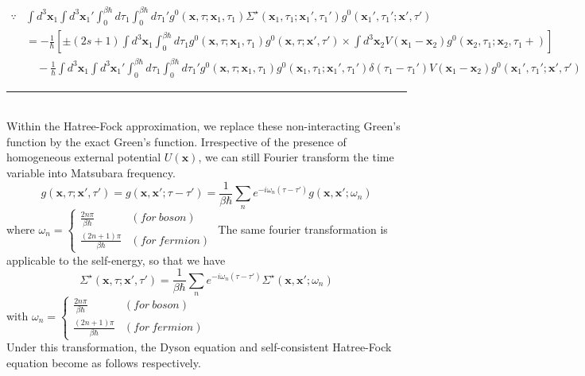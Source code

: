 \[
\begin{aligned}
\because &\int d^3 \mathbf{x}_1 \int d^3 \mathbf{x}_1' \int_0^{\beta\hbar} d\tau_1 \int_0^{\beta\hbar} d\tau_1' g^0(\mathbf{x},\tau;\mathbf{x}_1,\tau_1) \Sigma^\star(\mathbf{x}_1,\tau_1;\mathbf{x}_1',\tau_1') g^0(\mathbf{x}_1',\tau_1';\mathbf{x}',\tau')\\
&=-\frac{1}{\hbar} \left[\pm(2s+1)\int d^3 \mathbf{x}_1 \int_0^{\beta\hbar} d\tau_1 g^0(\mathbf{x},\tau;\mathbf{x}_1,\tau_1) g^0(\mathbf{x},\tau;\mathbf{x}',\tau')\times\int d^3 \mathbf{x}_2 V(\mathbf{x}_1-\mathbf{x}_2) g^0(\mathbf{x}_2,\tau_1;\mathbf{x}_2,\tau_1+)\right]\\
&\quad-\frac{1}{\hbar} \int d^3 \mathbf{x}_1 \int d^3 \mathbf{x}_1' \int_0^{\beta\hbar} d\tau_1 \int_0^{\beta\hbar} d\tau_1' g^0(\mathbf{x},\tau;\mathbf{x}_1,\tau_1) g^0(\mathbf{x}_1,\tau_1;\mathbf{x}_1',\tau_1') \delta(\tau_1-\tau_1') V(\mathbf{x}_1-\mathbf{x}_2) g^0(\mathbf{x}_1',\tau_1';\mathbf{x}',\tau')
\end{aligned}
\]
\rule{\textwidth}{1mm}\\
Within the Hatree-Fock approximation, we replace these non-interacting Green's function by the exact Green's function.
Irrespective of the presence of homogeneous external potential $U(\mathbf{x})$, we can still Fourier transform the time variable into Matsubara frequency.
\begin{equation}
g(\mathbf{x},\tau;\mathbf{x}',\tau')=g(\mathbf{x},\mathbf{x}';\tau-\tau')=\frac{1}{\beta\hbar}\sum_n e^{-i\omega_n(\tau-\tau')} g(\mathbf{x},\mathbf{x}';\omega_n)
\end{equation}
where
$
\omega_n=
\begin{cases}
\frac{2n\pi}{\beta\hbar} & (for\ boson)\\
\frac{(2n+1)\pi}{\beta\hbar} & (for\ fermion)
\end{cases}
$
The same fourier transformation is applicable to the self-energy, so that we have
\begin{equation}
\Sigma^\star(\mathbf{x},\tau;\mathbf{x}',\tau')=\frac{1}{\beta\hbar}\sum_n e^{-i\omega_n(\tau-\tau')} \Sigma^\star(\mathbf{x},\mathbf{x}';\omega_n)
\end{equation}
with $
\omega_n=
\begin{cases}
\frac{2n\pi}{\beta\hbar} & (for\ boson)\\
\frac{(2n+1)\pi}{\beta\hbar} & (for\ fermion)
\end{cases}
$\\
Under this transformation, the Dyson equation and self-consistent Hatree-Fock equation become as follows respectively.
